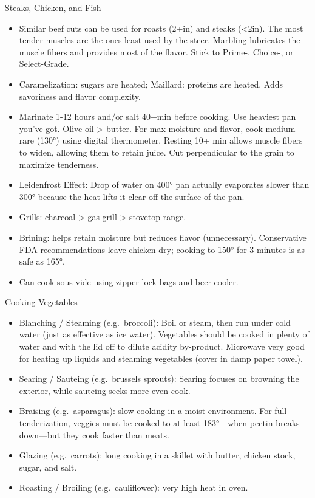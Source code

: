 \documentclass[
]{article}
\begin{document}
Steaks, Chicken, and Fish

\begin{itemize}
\item
  Similar beef cuts can be used for roasts (2+in) and steaks
  (\textless2in). The most tender muscles are the ones least used by the
  steer. Marbling lubricates the muscle fibers and provides most of the
  flavor. Stick to Prime-, Choice-, or Select-Grade.
\item
  Caramelization: sugars are heated; Maillard: proteins are heated. Adds
  savoriness and flavor complexity.
\item
  Marinate 1-12 hours and/or salt 40+min before cooking. Use heaviest
  pan you've got. Olive oil \textgreater{} butter. For max moisture and
  flavor, cook medium rare (130°) using digital thermometer. Resting 10+
  min allows muscle fibers to widen, allowing them to retain juice. Cut
  perpendicular to the grain to maximize tenderness.
\item
  Leidenfrost Effect: Drop of water on 400° pan actually evaporates
  slower than 300° because the heat lifts it clear off the surface of
  the pan.
\item
  Grills: charcoal \textgreater{} gas grill \textgreater{} stovetop
  range.
\item
  Brining: helps retain moisture but reduces flavor (unnecessary).
  Conservative FDA recommendations leave chicken dry; cooking to 150°
  for 3 minutes is as safe as 165°.
\item
  Can cook sous-vide using zipper-lock bags and beer cooler.
\end{itemize}

Cooking Vegetables

\begin{itemize}
\item
  Blanching / Steaming (e.g.~broccoli): Boil or steam, then run under
  cold water (just as effective as ice water). Vegetables should be
  cooked in plenty of water and with the lid off to dilute acidity
  by-product. Microwave very good for heating up liquids and steaming
  vegetables (cover in damp paper towel).
\item
  Searing / Sauteing (e.g.~brussels sprouts): Searing focuses on
  browning the exterior, while sauteing seeks more even cook.
\item
  Braising (e.g.~asparagus): slow cooking in a moist environment. For
  full tenderization, veggies must be cooked to at least 183°---when
  pectin breaks down---but they cook faster than meats.
\item
  Glazing (e.g.~carrots): long cooking in a skillet with butter, chicken
  stock, sugar, and salt.
\item
  Roasting / Broiling (e.g.~cauliflower): very high heat in oven.
\end{itemize}
\end{document}
